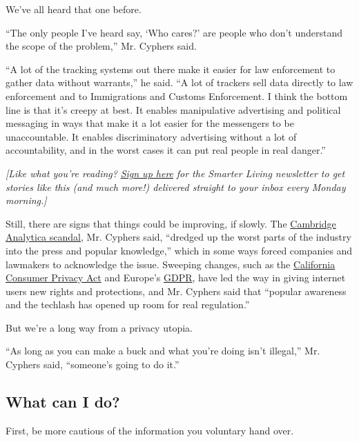 We've all heard that one before.

``The only people I've heard say, `Who cares?' are people who don't
understand the scope of the problem,'' Mr. Cyphers said.

``A lot of the tracking systems out there make it easier for law
enforcement to gather data without warrants,'' he said. ``A lot of
trackers sell data directly to law enforcement and to Immigrations and
Customs Enforcement. I think the bottom line is that it's creepy at
best. It enables manipulative advertising and political messaging in
ways that make it a lot easier for the messengers to be unaccountable.
It enables discriminatory advertising without a lot of accountability,
and in the worst cases it can put real people in real danger.''

\emph{{[}Like what you're reading?}
\href{https://www.nytimes3xbfgragh.onion/newsletters/smarter-living?module=inline}{\emph{Sign
up here}} \emph{for the Smarter Living newsletter to get stories like
this (and much more!) delivered straight to your inbox every Monday
morning.{]}}

Still, there are signs that things could be improving, if slowly. The
\href{https://www.nytimes3xbfgragh.onion/2018/04/04/us/politics/cambridge-analytica-scandal-fallout.html}{Cambridge
Analytica scandal}, Mr. Cyphers said, ``dredged up the worst parts of
the industry into the press and popular knowledge,'' which in some ways
forced companies and lawmakers to acknowledge the issue. Sweeping
changes, such as the
\href{https://www.nytimes3xbfgragh.onion/2018/06/28/technology/california-online-privacy-law.html?module=inline}{California
Consumer Privacy Act} and Europe's
\href{https://www.nytimes3xbfgragh.onion/2018/05/24/technology/europe-gdpr-privacy.html}{GDPR},
have led the way in giving internet users new rights and protections,
and Mr. Cyphers said that ``popular awareness and the techlash has
opened up room for real regulation.''

But we're a long way from a privacy utopia.

``As long as you can make a buck and what you're doing isn't illegal,''
Mr. Cyphers said, ``someone's going to do it.''

\hypertarget{what-can-i-do}{%
\subsection{What can I do?}\label{what-can-i-do}}

First, be more cautious of the information you voluntary hand over.

